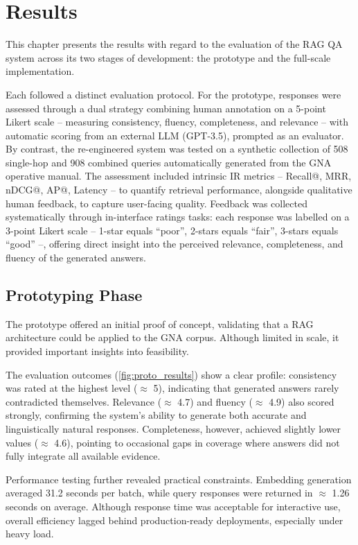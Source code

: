 \chapter{Results}
\label{chap:results}
\begin{spacing}{1.5}

This chapter presents the results with regard to the evaluation of the RAG QA system across its two stages of development: the prototype and the full-scale implementation. 

Each followed a distinct evaluation protocol. For the prototype, responses were assessed through a dual strategy combining human annotation on a 5-point Likert scale -- measuring consistency, fluency, completeness, and relevance -- with automatic scoring from an external LLM (GPT-3.5), prompted as an evaluator. By contrast, the re-engineered system was tested on a synthetic collection of 508 single-hop and 908 combined queries automatically generated from the GNA operative manual. The assessment included intrinsic IR metrics -- Recall@, MRR, nDCG@, AP@, Latency --  to quantify retrieval performance, alongside qualitative human feedback, to capture user-facing quality. Feedback was collected systematically through in-interface ratings tasks: each response was labelled on a 3-point Likert scale -- 1-star equals ``poor'', 2-stars equals ``fair'', 3-stars equals ``good'' --, offering direct insight into the perceived relevance, completeness, and fluency of the generated answers.


\section{Prototyping Phase}
The prototype offered an initial proof of concept, validating that a RAG architecture could be applied to the GNA corpus. Although limited in scale, it provided important insights into feasibility.

The evaluation outcomes (\autoref{fig:proto_results}) show a clear profile: consistency was rated at the highest level ($\approx$ 5), indicating that generated answers rarely contradicted themselves. Relevance ($\approx$ 4.7) and fluency ($\approx$ 4.9) also scored strongly, confirming the system’s ability to generate both accurate and linguistically natural responses. Completeness, however, achieved slightly lower values ($\approx$ 4.6), pointing to occasional gaps in coverage where answers did not fully integrate all available evidence.

Performance testing further revealed practical constraints. Embedding generation averaged 31.2 seconds per batch, while query responses were returned in $\approx$ 1.26 seconds on average. Although response time was acceptable for interactive use, overall efficiency lagged behind production-ready deployments, especially under heavy load. 


\end{spacing}
